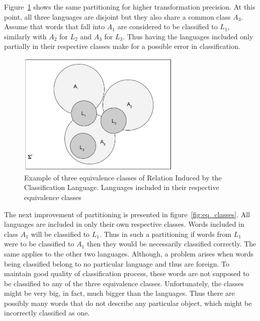 \documentclass{mini}
\begin{document}
Figure~\ref{fig:eq_classes_high_precision} shows the same partitioning for higher transformation precision. At this point, all three languages are disjoint but they also share a common class $A_{3}$. Assume that words that fall into $A_{1}$ are considered to be classified to $L_{1}$, similarly with $A_{2}$ for $L_{2}$ and $A_{3}$ for $L_{3}$. Thus having the languages included only partially in their respective classes make for a possible error in classification.

\begin{figure}[H]
    \centering
    \includegraphics[width=0.7\textwidth]{./images/equivalence_classes_high_pt.jpg}
    \caption{Example of three equivalence classes of Relation Induced by the Classification Language. Languages included in their respective equivalence classes}
    \label{fig:eq_classes_high_precision}
\end{figure}

The next improvement of partitioning is presented in figure~\ref{fig:eq_classes}. All languages are included in only their own respective classes. Words included in class $A_{1}$ will be classified to $L_{1}$. Thus in such a partitioning if words from $L_{1}$ were to be classified to $A_{1}$ then they would be necessarily classified correctly. The same applies to the other two languages. Although, a problem arises when words being classified belong to no particular language and thus are foreign. To maintain good quality of classification process, these words are not supposed to be classified to any of the three equivalence classes. Unfortunately, the classes might be very big, in fact, much bigger than the languages. Thus there are possibly many words that do not describe any particular object, which might be incorrectly classified as one. 
\end{document}
